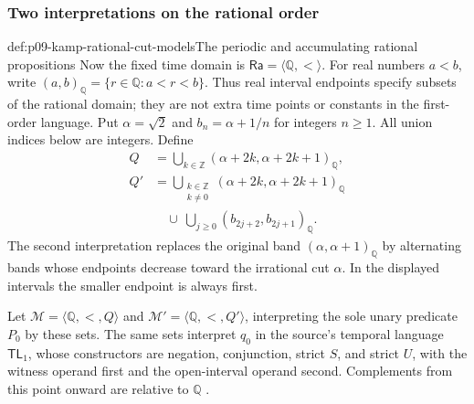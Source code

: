 \subsubsection{Two interpretations on the rational order}

\begin{hbdefinition}{def:p09-kamp-rational-cut-models}{The periodic and accumulating rational propositions}
Now the fixed time domain is
\(\mathsf{Ra}=\langle\mathbb Q,<\rangle\).
For real numbers \(a<b\), write
\((a,b)_{\mathbb Q}=\{r\in\mathbb Q:a<r<b\}\).
Thus real interval endpoints specify subsets of the rational domain;
they are not extra time points or constants in the first-order language.
Put \(\alpha=\sqrt2\) and \(b_n=\alpha+1/n\) for
integers \(n\geq1\). All union indices below are integers.
Define
\[
\begin{aligned}
 Q&=\bigcup_{k\in\mathbb Z}
                   (\alpha+2k,\alpha+2k+1)_{\mathbb Q},\\
 Q'&=\bigcup_{\substack{k\in\mathbb Z\\k\ne0}}
                   (\alpha+2k,\alpha+2k+1)_{\mathbb Q}\\
   &\quad\cup\
       \bigcup_{j\geq0}(b_{2j+2},b_{2j+1})_{\mathbb Q}.
\end{aligned}
\]
The second interpretation replaces the original band
\((\alpha,\alpha+1)_{\mathbb Q}\) by alternating bands
whose endpoints decrease toward the irrational cut \(\alpha\).
In the displayed intervals the smaller endpoint is always first.

Let \(\mathcal M=\langle\mathbb Q,<,Q\rangle\) and
\(\mathcal M'=\langle\mathbb Q,<,Q'\rangle\), interpreting
the sole unary predicate \(P_0\) by these sets. The same sets
interpret \(q_0\) in the source's temporal language
\(\mathsf{TL}_1\), whose constructors are negation,
conjunction, strict \(S\), and strict \(U\), with the
witness operand first and the open-interval operand second.
Complements from this point onward are relative to \(\mathbb Q\)
\cite[ch.~IV, thm.~5 construction, pp.~109--110]{Kamp1968}.
\end{hbdefinition}

